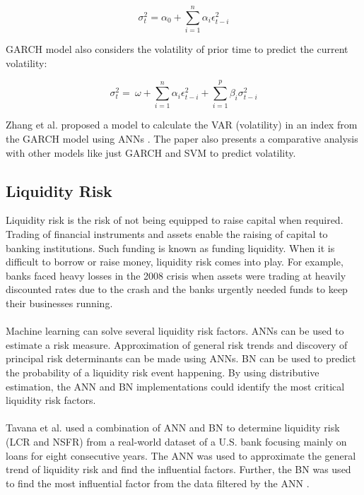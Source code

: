 \documentclass[a4paper, 12pt]{article}
\begin{document}
\begin{equation}
    \sigma_t^2 = \alpha_0 + \sum_{i = 1}^{n} \alpha_i \epsilon_{t - i}^2
\end{equation}

\noindent GARCH model also considers the volatility of prior time to predict the current volatility:

\begin{equation}
    \sigma_t^2 = \ \omega + \sum_{i = 1}^{n} \alpha_i \epsilon_{t - i}^2 + \sum_{i = 1}^{p} \beta_i \sigma_{t - i}^2
\end{equation}

\noindent Zhang et al. proposed a model to calculate the VAR (volatility) in an index from the GARCH model using ANNs \cite{zhang2017calculating}. The paper also presents a comparative analysis with other models like just GARCH and SVM to predict volatility.

\vskip 0.2in
\subsection{Liquidity Risk}
\noindent Liquidity risk is the risk of not being equipped to raise capital when required. Trading of financial instruments and assets enable the raising of capital to banking institutions. Such funding is known as funding liquidity. When it is difficult to borrow or raise money, liquidity risk comes into play. For example, banks faced heavy losses in the 2008 crisis when assets were trading at heavily discounted rates due to the crash and the banks urgently needed funds to keep their businesses running.
\\
\\
\noindent Machine learning can solve several liquidity risk factors. ANNs can be used to estimate a risk measure. Approximation of general risk trends and discovery of principal risk determinants can be made using ANNs. BN can be used to predict the probability of a liquidity risk event happening.  By using distributive estimation, the ANN and BN implementations could identify the most critical liquidity risk factors.
\\
\\
\noindent Tavana et al. used a combination of ANN and BN to determine liquidity risk (LCR and NSFR) from a real-world dataset of a U.S. bank focusing mainly on loans for eight consecutive years. The ANN was used to approximate the general trend of liquidity risk and find the influential factors. Further, the BN was used to find the most influential factor from the data filtered by the ANN \cite{tavana2018artificial}.
\end{document}
